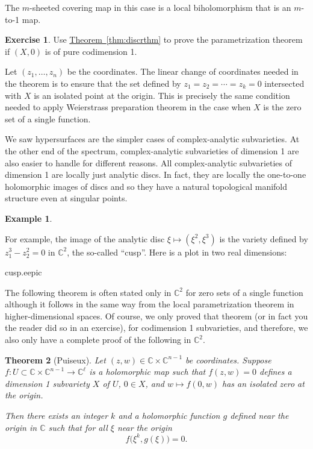 \documentclass[12pt,openany]{book}
\newcommand{\C}{{\mathbb{C}}}
\newcommand{\myindex}[1]{#1\index{#1}}
\theoremstyle{plain}
\newtheorem{thm}{Theorem}[section]
\theoremstyle{remark}
\theoremstyle{definition}
\newenvironment{exbox}{%
    \def\FrameCommand{\vrule width 1pt \relax\hspace {10pt}}%
    \MakeFramed {\advance \hsize -\width \FrameRestore }%
}{%
    \endMakeFramed
}
\theoremstyle{exercise}
\newtheorem{exercise}{Exercise}[section]
\theoremstyle{example}
\newtheorem{example}[thm]{Example}
\newcommand{\thmref}[1]{\hyperref[#1]{Theorem~\ref*{#1}}}
\begin{document}
The $m$-sheeted covering map in this case is a local biholomorphism
that is an $m$-to-1 map.

\begin{exbox}
\begin{exercise}
Use \thmref{thm:discrthm}
to prove the parametrization theorem if $(X,0)$ is
of pure codimension 1.
\end{exercise}
\end{exbox}

Let $(z_1,\ldots,z_n)$ be the coordinates.
The linear change of coordinates needed in the theorem is
to ensure that the set defined by $z_1=z_2=\cdots=z_k = 0$ intersected
with $X$ is an isolated point at the origin.  This is precisely
the same condition needed to apply Weierstrass preparation theorem in the case
when $X$ is the zero set of a single function.

We saw hypersurfaces are the simpler cases of complex-analytic
subvarieties.  At the other end of the spectrum, complex-analytic
subvarieties of dimension 1 are also easier to handle for different reasons.
All complex-analytic subvarieties of dimension 1 are locally just analytic discs.
In fact, they are locally the one-to-one holomorphic images of discs
and so they have a natural topological manifold structure even at singular
points.

\begin{example}
\begin{samepage}
For example, the image of the analytic disc
$\xi \mapsto (\xi^2,\xi^3)$ is the variety
defined by $z_1^3-z_2^2 = 0$ in $\C^2$, the so-called ``cusp''.  Here is a
plot in two real dimensions:

\nopagebreak
\begin{center}
\medskip
{cusp.eepic}
\bigskip
\end{center}
\end{samepage}
\end{example}


The following theorem is often stated only in $\C^2$ for zero sets of
a single function although it follows in
the same way from the local parametrization theorem in higher-dimensional
spaces.  Of course, we only
proved that theorem (or in fact you the reader did so in an exercise), for
codimension 1 subvarieties, and therefore, we also only have a complete
proof of the following in $\C^2$.

\begin{thm}[\myindex{Puiseux}]
Let $(z,w) \in \C \times \C^{n-1}$ be coordinates.
Suppose $f \colon U \subset \C \times \C^{n-1} \to \C^\ell$
is a holomorphic map such that
$f(z,w) = 0$ defines a dimension 1 subvariety $X$ of $U$,
$0 \in X$,
and $w \mapsto f(0,w)$ has an isolated zero at the origin.

Then there exists an integer $k$ and a holomorphic function $g$ defined near
the origin in $\C$ such that
for all $\xi$ near the origin
\begin{equation*}
f\bigl(\xi^k,g(\xi)\bigr) = 0 .
\end{equation*}
\end{thm}
\end{document}
